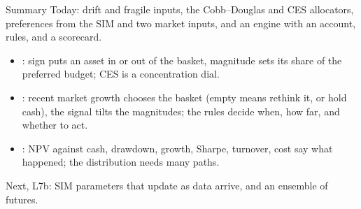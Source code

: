 \documentclass[aspectratio=169,11pt]{beamer}
\begin{document}
\begin{frame}{Summary}
  Today: drift and fragile inputs, the Cobb--Douglas and CES allocators,
  preferences from the SIM and two market inputs, and an engine with an account,
  rules, and a scorecard.

  {\large\textbf{}}
  \begin{itemize}\setlength{\itemsep}{0.1em}
    \item {}: sign puts an asset in or out of the basket,
      magnitude sets its share of the preferred budget; CES is a concentration dial.
    \item {}: recent market growth chooses the basket (empty
      means rethink it, or hold cash), the signal tilts the magnitudes; the rules
      decide when, how far, and whether to act.
    \item {}: NPV against cash,
      drawdown, growth, Sharpe, turnover, cost say what happened; the distribution
      needs many paths.
  \end{itemize}
  Next, L7b: SIM parameters that update as data arrive, and an ensemble of futures.
\end{frame}

\end{document}
